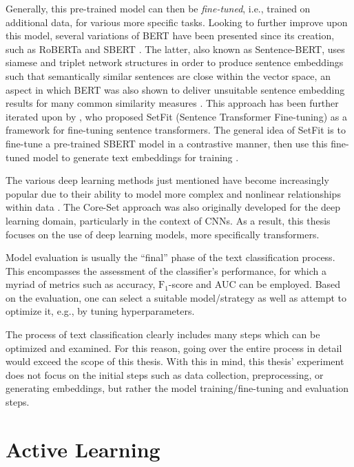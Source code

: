\documentclass[english,bachelor,ul]{webisthesis} %
\begin{document}
Generally, this pre-trained model can then be \textit{fine-tuned}, i.e., trained on additional data, for various more specific tasks. Looking to further improve upon this model, several variations of BERT have been presented since its creation, such as RoBERTa \citep{DBLP:journals/corr/abs-1907-11692} and SBERT \citep{DBLP:conf/emnlp/ReimersG19}. The latter, also known as Sentence-BERT, uses siamese and triplet network structures in order to produce sentence embeddings such that semantically similar sentences are close within the vector space, an aspect in which BERT was also shown to deliver unsuitable sentence embedding results for many common similarity measures \citep{DBLP:conf/emnlp/ReimersG19}. This approach has been further iterated upon by \cite{DBLP:setfit}, who proposed SetFit (Sentence Transformer Fine-tuning) as a framework for fine-tuning sentence transformers. The general idea of SetFit is to fine-tune a pre-trained SBERT model in a contrastive manner, then use this fine-tuned model to generate text embeddings for training \citep{DBLP:setfit}. 

The various deep learning methods just mentioned have become increasingly popular due to their ability to model more complex and nonlinear relationships within data \citep{DBLP:journals/nature/LeCunBH15}.
The Core-Set approach was also originally developed for the deep learning domain, particularly in the context of CNNs. As a result, this thesis focuses on the use of deep learning models, more specifically transformers.

Model evaluation is usually the ``final'' phase of the text classification process. This encompasses the assessment of the classifier's performance, for which a myriad of metrics such as accuracy, $\text{F}_1$-score and AUC can be employed. Based on the evaluation, one can select a suitable model/strategy as well as attempt to optimize it, e.g., by tuning hyperparameters.

The process of text classification clearly includes many steps which can be optimized and examined. For this reason, going over the entire process in detail would exceed the scope of this thesis. With this in mind, this thesis' experiment does not focus on the initial steps such as data collection, preprocessing, or generating embeddings, but rather the model training/fine-tuning and evaluation steps.


\section{Active Learning}
\end{document}
